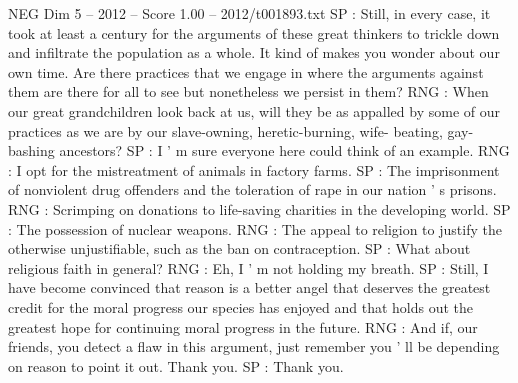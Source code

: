 \begin{textsample}{NEG Dim 5 – 2012 – Score 1.00 – 2012/t001893.txt}
SP : Still, in every case, it took at least a century for the arguments of these great thinkers to trickle down and infiltrate the population as a whole.
It kind of makes you wonder about our own time.
Are there practices that we engage in where the arguments against them are there for all to see but nonetheless we persist in them?
RNG : When our great grandchildren look back at us, will they be as appalled by some of our practices as we are by our slave-owning, heretic-burning, wife- beating, gay-bashing ancestors?
SP : I ' m sure everyone here could think of an example.
RNG : I opt for the mistreatment of animals in factory farms.
SP : The imprisonment of nonviolent drug offenders and the toleration of rape in our nation ' s prisons.
RNG : Scrimping on donations to life-saving charities in the developing world.
SP : The possession of nuclear weapons.
RNG : The appeal to religion to justify the otherwise unjustifiable, such as the ban on contraception.
SP : What about religious faith in general?
RNG : Eh, I ' m not holding my breath.
SP : Still, I have become convinced that reason is a better angel that deserves the greatest credit for the moral progress our species has enjoyed and that holds out the greatest hope for continuing moral progress in the future.
RNG : And if, our friends, you detect a flaw in this argument, just remember you ' ll be depending on reason to point it out.
Thank you.
SP : Thank you.

\end{textsample}
